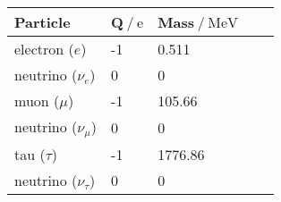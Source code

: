 \begin{table}[]
    \begin{tabular}{lllll}
    \toprule 
    \textbf{Particle} & {\textbf{Q}$\:/\: \mathrm{e}$} & {\textbf{Mass}$\:/\: \mathrm{MeV}$} \\ 
    \midrule
     electron ($e$) & -1 &  0.511  \\
     neutrino ($\nu_e$) & 0 &  0  \\
     \midrule
     muon ($\mu$) & -1 &  105.66  \\
     neutrino ($\nu_\mu$) & 0 & 0 \\
     \midrule
     tau ($\tau$) & -1 & 1776.86 \\
     neutrino ($\nu_\tau$) & 0 & 0 \\
     \bottomrule
    \end{tabular}
\end{table}